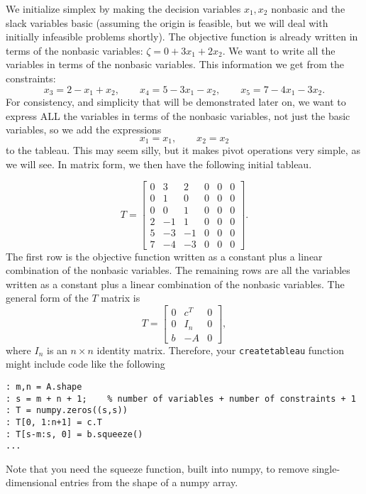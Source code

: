 We initialize simplex by making the decision variables $x_1, x_2$ nonbasic and the slack variables basic (assuming the origin is feasible, but we will deal with initially infeasible problems shortly). The objective function is already written in terms of the nonbasic variables: $\zeta = 0 + 3x_1 + 2x_2$. We want to write all the variables in terms of the nonbasic variables. This information we get from the constraints:
\[ x_3 = 2 - x_1 + x_2, \qquad x_4 = 5 - 3x_1 - x_2, \qquad x_5 = 7 - 4x_1 - 3x_2. \]
For consistency, and simplicity that will be demonstrated later on, we want to express ALL the variables in terms of the nonbasic variables, not just the basic variables, so we add the expressions
\[ x_1 = x_1, \qquad x_2 = x_2 \]
to the tableau. This may seem silly, but it makes pivot operations very simple, as we will see. In matrix form, we then have the following initial tableau.

\[
	T = \begin{bmatrix}
		0 & 3 & 2 & 0 & 0 & 0 \\
		0 & 1 & 0 & 0 & 0 & 0 \\
		0 & 0 & 1 & 0 & 0 & 0 \\
		2 &-1 & 1 & 0 & 0 & 0 \\
		5 &-3 &-1 & 0 & 0 & 0 \\
		7 &-4 &-3 & 0 & 0 & 0
	\end{bmatrix}.
\]
The first row is the objective function written as a constant plus a linear combination of the nonbasic variables. The remaining rows are all the variables written as a constant plus a linear combination of the nonbasic variables. The general form of the $T$ matrix is
\[ T = \begin{bmatrix}
    0 & c^T   & 0 \\
    0 & I_n & 0 \\
    b & -A  & 0
\end{bmatrix}, \]
where $I_n$ is an $n \times n$ identity matrix. Therefore, your {\tt createtableau} function might include code like the following

\begin{lstlisting}
: m,n = A.shape
: s = m + n + 1;    % number of variables + number of constraints + 1
: T = numpy.zeros((s,s))
: T[0, 1:n+1] = c.T
: T[s-m:s, 0] = b.squeeze()
...
\end{lstlisting}

Note that you need the squeeze function, built into numpy, to remove single-dimensional entries from the shape of a numpy array. 

